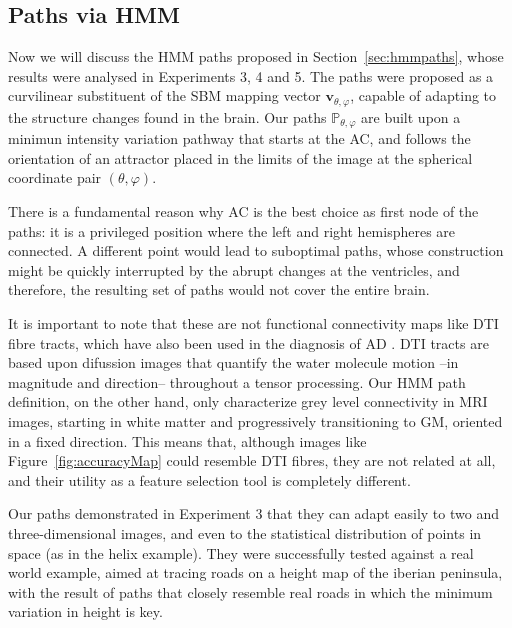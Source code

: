 \subsection{Paths via \acs{HMM}}\label{sec:discussion}
Now we will discuss the \ac{HMM} paths proposed in Section~\ref{sec:hmmpaths}, whose results were analysed in Experiments 3, 4 and 5. The paths were proposed as a curvilinear substituent of the \ac{SBM} mapping vector $\mathbf{v}_{\theta,\varphi}$, capable of adapting to the structure changes found in the brain. Our paths $\mathbb{P}_{\theta,\varphi}$ are built upon a minimun intensity variation pathway that starts at the \ac{AC}, and follows the orientation of an attractor placed in the limits of the image at the spherical coordinate pair $(\theta,\varphi)$. 

There is a fundamental reason why \ac{AC} is the best choice as first node of the paths: it is a privileged position where the left and right hemispheres are connected. A different point would lead to suboptimal paths, whose construction might be quickly interrupted by the abrupt changes at the ventricles, and therefore, the resulting set of paths would not cover the entire brain. 

It is important to note that these are not functional connectivity maps like \acf{DTI} fibre tracts, which have also been used in the diagnosis of \ac{AD} \cite{Grana2011,Medina2008}. \ac{DTI} tracts are based upon difussion images that quantify the water molecule motion --in magnitude and direction-- throughout a tensor processing. Our \ac{HMM} path definition, on the other hand, only characterize grey level connectivity in \ac{MRI} images, starting in white matter and progressively transitioning to \ac{GM}, oriented in a fixed direction. This means that, although images like Figure~\ref{fig:accuracyMap} could resemble \ac{DTI} fibres, they are not related at all, and their utility as a feature selection tool is completely different. 

Our paths demonstrated in Experiment 3 that they can adapt easily to two and three-dimensional images, and even to the statistical distribution of points in space (as in the helix example). They were successfully tested against a real world example, aimed at tracing roads on a height map of the iberian peninsula, with the result of paths that closely resemble real roads in which the minimum variation in height is key. 

